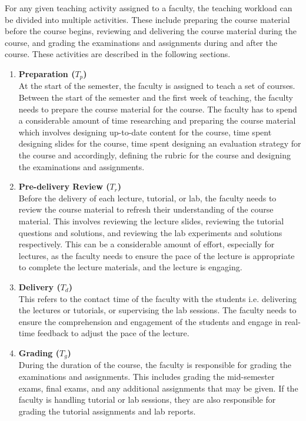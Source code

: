 For any given teaching activity assigned to a faculty, the teaching workload can be divided into multiple activities. These include preparing the course material before the course begins, reviewing and delivering the course material during the course, and grading the examinations and assignments during and after the course. These activities are described in the following sections.

\begin{enumerate}
  \item \textbf{Preparation (\(T_p\))} \\
        At the start of the semester, the faculty is assigned to teach a set of courses. Between the start of the semester and the first week of teaching, the faculty needs to prepare the course material for the course. The faculty has to spend a considerable amount of time researching and preparing the course material which involves designing up-to-date content for the course, time spent designing slides for the course, time spent designing an evaluation strategy for the course and accordingly, defining the rubric for the course and designing the examinations and assignments.

  \item \textbf{Pre-delivery Review (\(T_r\))} \\
        Before the delivery of each lecture, tutorial, or lab, the faculty needs to review the course material to refresh their understanding of the course material. This involves reviewing the lecture slides, reviewing the tutorial questions and solutions, and reviewing the lab experiments and solutions respectively. This can be a considerable amount of effort, especially for lectures, as the faculty needs to ensure the pace of the lecture is appropriate to complete the lecture materials, and the lecture is engaging.

  \item \textbf{Delivery (\(T_d\))} \\
        This refers to the contact time of the faculty with the students i.e. delivering the lectures or tutorials, or supervising the lab sessions. The faculty needs to ensure the comprehension and engagement of the students and engage in real-time feedback to adjust the pace of the lecture.

  \item \textbf{Grading (\(T_g\))} \\
        During the duration of the course, the faculty is responsible for grading the examinations and assignments. This includes grading the mid-semester exams, final exams, and any additional assignments that may be given. If the faculty is handling tutorial or lab sessions, they are also responsible for grading the tutorial assignments and lab reports.


\end{enumerate}

